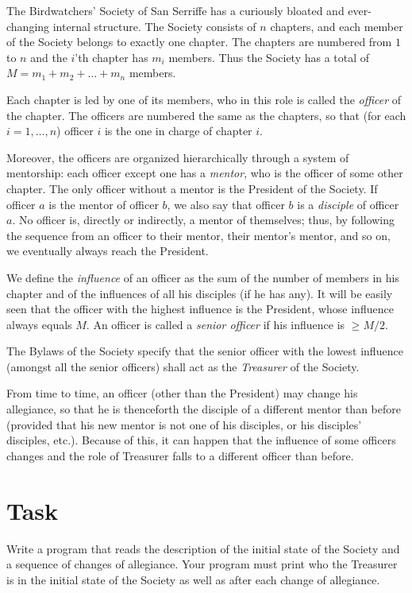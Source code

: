 
The Birdwatchers' Society of San Serriffe has a curiously bloated and
ever-changing internal structure. The Society consists of $n$ chapters, and each
member of the Society belongs to exactly one chapter. The chapters are numbered
from $1$ to $n$ and the $i$'th chapter has $m_i$ members. Thus the Society has a
total of $M = m_1 + m_2 + \ldots + m_n$ members.

Each chapter is led by one of its members, who in this role is called the
\emph{officer} of the chapter. The officers are numbered the same as the
chapters, so that (for each $i = 1, \ldots, n$) officer $i$ is the one in charge
of chapter $i$.

Moreover, the officers are organized hierarchically through a system of
mentorship: each officer except one has a \emph{mentor}, who is the officer of
some other chapter. The only officer without a mentor is the President of the
Society. If officer $a$ is the mentor of officer $b$, we also say that officer
$b$ is a \emph{disciple} of officer $a$. No officer is, directly or indirectly,
a mentor of themselves; thus, by following the sequence from an officer to their
mentor, their mentor's mentor, and so on, we eventually always reach the
President.

We define the \emph{influence} of an officer as the sum of the number of members
in his chapter and of the influences of all his disciples (if he has any). It
will be easily seen that the officer with the highest influence is the
President, whose influence always equals $M$. An officer is called a
\emph{senior officer} if his influence is $\geq M/2$.

The Bylaws of the Society specify that the senior officer with the lowest
influence (amongst all the senior officers) shall act as the \emph{Treasurer} of
the Society.

From time to time, an officer (other than the President) may change his
allegiance, so that he is thenceforth the disciple of a different mentor than
before (provided that his new mentor is not one of his disciples, or his
disciples' disciples, etc.). Because of this, it can happen that the influence
of some officers changes and the role of Treasurer falls to a different officer
than before.

\section*{Task}
Write a program that reads the description of the initial state of the Society
and a sequence of changes of allegiance. Your program must print who the
Treasurer is in the initial state of the Society as well as after each change of
allegiance.

